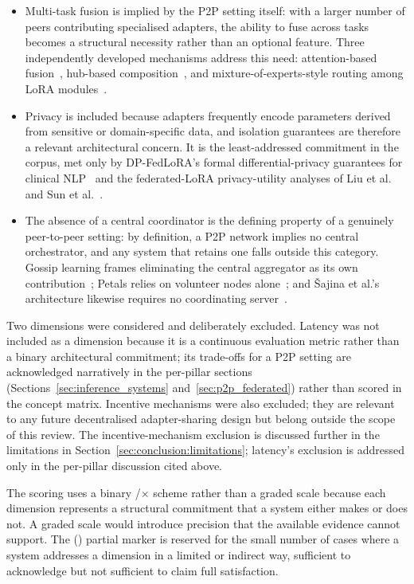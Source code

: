 \begin{itemize}
    \item Multi-task fusion is implied by the P2P setting itself: with a larger number of peers contributing specialised adapters, the ability to fuse across tasks becomes a structural necessity rather than an optional feature. Three independently developed mechanisms address this need: attention-based fusion~\cite{Pfeiffer2021fusion}, hub-based composition~\cite{Huang2023}, and mixture-of-experts-style routing among LoRA modules~\cite{LiMixLoRA2024,ZhangMiLoRA2024}.
    \item Privacy is included because adapters frequently encode parameters derived from sensitive or domain-specific data, and isolation guarantees are therefore a relevant architectural concern. It is the least-addressed commitment in the corpus, met only by DP-FedLoRA's formal differential-privacy guarantees for clinical NLP~\cite{XuDPFedLoRA2025} and the federated-LoRA privacy-utility analyses of Liu et al.~\cite{LiuDP2023} and Sun et al.~\cite{SunImprovingLoRA2024}.
    \item The absence of a central coordinator is the defining property of a genuinely peer-to-peer setting: by definition, a P2P network implies no central orchestrator, and any system that retains one falls outside this category. Gossip learning frames eliminating the central aggregator as its own contribution~\cite{HegeduisGossip2019}; Petals relies on volunteer nodes alone~\cite{Borzunov2023}; and {\v{S}}ajina et al.'s architecture likewise requires no coordinating server~\cite{Sajina2024}.
\end{itemize}

Two dimensions were considered and deliberately excluded. Latency was not included as a dimension because it is a continuous evaluation metric rather than a binary architectural commitment; its trade-offs for a P2P setting are acknowledged narratively in the per-pillar sections (Sections~\ref{sec:inference_systems} and~\ref{sec:p2p_federated}) rather than scored in the concept matrix. Incentive mechanisms were also excluded; they are relevant to any future decentralised adapter-sharing design but belong outside the scope of this review. The incentive-mechanism exclusion is discussed further in the limitations in Section~\ref{sec:conclusion:limitations}; latency's exclusion is addressed only in the per-pillar discussion cited above.

The scoring uses a binary \checkmark/$\times$ scheme rather than a graded scale because each dimension represents a structural commitment that a system either makes or does not. A graded scale would introduce precision that the available evidence cannot support. The (\checkmark) partial marker is reserved for the small number of cases where a system addresses a dimension in a limited or indirect way, sufficient to acknowledge but not sufficient to claim full satisfaction.

